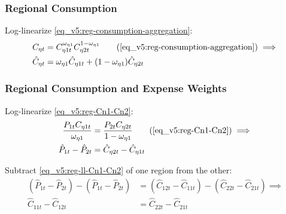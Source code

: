 \documentclass[../thesis.tex]{subfiles}
\begin{document}
\begin{tcolorbox}[colback=red!5!white,colframe=red!75!black]

\subsubsection*{Regional Consumption}
	
	Log-linearize \ref{eq_v5:reg-consumption-aggregation}:
	\begin{align}
		C_{\eta t} &= C_{\eta 1 t}^{\omega_{\eta 1}} C_{\eta 2 t}^{1-\omega_{\eta 1}} \tag{\ref{eq_v5:reg-consumption-aggregation}} \implies \\
		\hat{C}_{\eta t} &= \omega_{\eta 1} \hat{C}_{\eta 1 t} + (1-\omega_{\eta 1}) \hat{C}_{\eta 2 t} \label{eq_v5:reg-ll-consumption-aggregation}
	\end{align}
	
\subsubsection*{Regional Consumption and Expense Weights}
	
	Log-linearize \ref{eq_v5:reg-Cn1-Cn2}:
	\begin{align}
		\frac{P_{1 t} C_{\eta 1 t}}{\omega_{\eta 1}} &= \frac{P_{2 t} C_{\eta 2 t}}{1 -\omega_{\eta 1}} \tag{\ref{eq_v5:reg-Cn1-Cn2}} \implies \\
		\hat{P}_{1 t} - \hat{P}_{2 t} &= \hat{C}_{\eta 2 t} - \hat{C}_{\eta 1 t} \label{eq_v5:reg-ll-Cn1-Cn2}
	\end{align}
	
	Subtract \ref{eq_v5:reg-ll-Cn1-Cn2} of one region from the other:
	\begin{align}
		(\hat{P}_{1 t} - \hat{P}_{2 t}) - (\hat{P}_{1 t} - \hat{P}_{2 t}) &= (\hat{C}_{12t} - \hat{C}_{11t}) - (\hat{C}_{22t} - \hat{C}_{21t}) \implies \nonumber \\
		\hat{C}_{11t} - \hat{C}_{12t} &= \hat{C}_{22t} - \hat{C}_{21t} \label{eq_v5:reg-ll-Cn1-Cn2-b}
	\end{align}
	
\end{tcolorbox}
\end{document}
